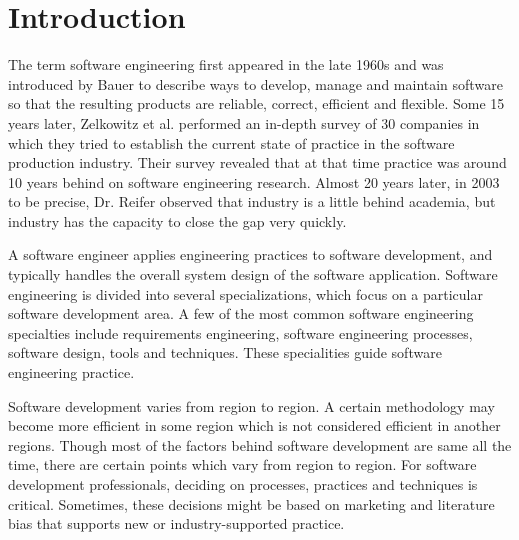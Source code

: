 \section{Introduction}
\label{sec:introduction}
The term software engineering first appeared in the late 1960s and was introduced by Bauer to describe ways to develop, manage and maintain software so that the resulting products are reliable, correct, efficient and flexible. Some 15 years later, Zelkowitz et al. \cite{Zelkowitz1984} performed an in-depth survey of 30 companies in which they tried to establish the current state of practice in the software production industry. Their survey revealed that at that time practice was around 10 years behind on software engineering research. Almost 20 years later, in 2003 to be precise, Dr. Reifer observed that industry is a little behind academia, but industry has the capacity to close the gap very quickly\cite{Reifer2003}.


A software engineer applies engineering practices to software development, and typically handles the overall system design of the software application. Software engineering is divided into several specializations, which focus on a particular software development area. A few of the most common software engineering specialties include requirements engineering, software engineering processes, software design, tools and techniques. These specialities guide software engineering practice.


Software development varies from region to region. A certain methodology may become more efficient in some region which is not considered efficient in another regions. Though most of the factors behind software development are same all the time, there are certain points which vary from region to region. For software development professionals, deciding on processes, practices and techniques is critical. Sometimes, these decisions might be based on marketing and literature bias that supports new or industry-supported practice.

